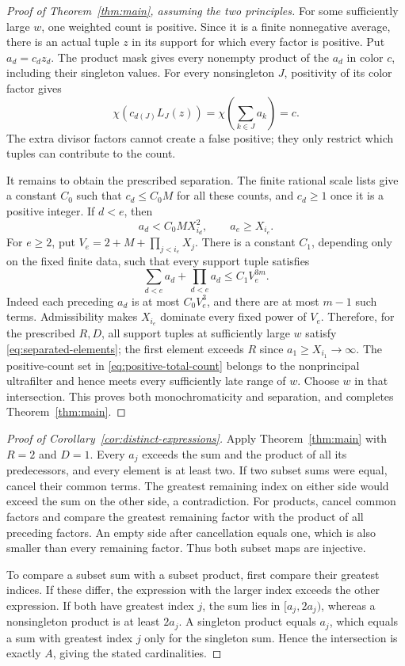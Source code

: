 \begin{proof}[Proof of Theorem~\ref{thm:main}, assuming the two principles]
For some sufficiently large $w$, one weighted count is positive.
Since it is a finite nonnegative average, there is an actual tuple
$z$ in its support for which every factor is positive. Put
$a_d=c_dz_d$. The product mask gives every nonempty product of
the $a_d$ in color $c$, including their singleton values.
For every nonsingleton $J$, positivity of its color factor gives
\[
 \chi\left(c_{d(J)}L_J(z)\right)
 =\chi\left(\sum_{k\in J}a_k\right)=c.
\]
The extra divisor factors cannot create a false positive; they only
restrict which tuples can contribute to the count.

It remains to obtain the prescribed separation. The finite rational scale lists
give a constant $C_0$ such that $c_d\le C_0M$ for all these counts,
and $c_d\ge1$ once it is a positive integer. If $d<e$, then
\[
 a_d<C_0M X_{i_d}^2,\qquad a_e\ge X_{i_e}.
\]
For $e\ge2$, put $V_e=2+M+\prod_{j<i_e}X_j$.
There is a constant $C_1$, depending only on the fixed finite data,
such that every support tuple satisfies
\[
 \sum_{d<e}a_d+\prod_{d<e}a_d\le C_1 V_e^{3m}.
\]
Indeed each preceding $a_d$ is at most $C_0V_e^3$, and there are
at most $m-1$ such terms. Admissibility makes $X_{i_e}$ dominate
every fixed power of $V_e$. Therefore, for the prescribed $R,D$,
all support tuples at sufficiently large $w$ satisfy
\eqref{eq:separated-elements}; the first element exceeds $R$ since
$a_1\ge X_{i_1}\to\infty$. The positive-count set in
\eqref{eq:positive-total-count} belongs to the nonprincipal
ultrafilter and hence meets every sufficiently late range of $w$.
Choose $w$ in that intersection. This proves both monochromaticity
and separation, and completes Theorem~\ref{thm:main}.
\end{proof}

\begin{proof}[Proof of Corollary~\ref{cor:distinct-expressions}]
Apply Theorem~\ref{thm:main} with $R=2$ and $D=1$.
Every $a_j$ exceeds the sum and the product of all its predecessors,
and every element is at least two. If two subset sums were equal,
cancel their common terms. The greatest remaining index on either
side would exceed the sum on the other side, a contradiction.
For products, cancel common factors and compare the greatest
remaining factor with the product of all preceding factors.
An empty side after cancellation equals one, which is also smaller
than every remaining factor. Thus both subset maps are injective.

To compare a subset sum with a subset product, first compare their
greatest indices. If these differ, the expression with the larger
index exceeds the other expression. If both have greatest index $j$,
the sum lies in $[a_j,2a_j)$, whereas a nonsingleton product is at
least $2a_j$. A singleton product equals $a_j$, which equals a sum
with greatest index $j$ only for the singleton sum. Hence the
intersection is exactly $A$, giving the stated cardinalities.
\end{proof}

